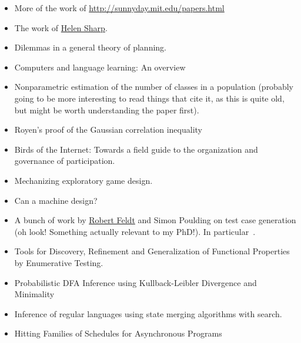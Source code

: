 \documentclass[a4paper]{book}
\begin{document}
\begin{itemize}
\item More of the work of \href{Nancy Leveson}{http://sunnyday.mit.edu/papers.html}
\item The work of \href{http://mcs.open.ac.uk/hcs2/}{Helen Sharp}.
\item Dilemmas in a general theory of planning\cite{rittel1973dilemmas}.
\item Computers and language learning: An overview\cite{warschauer1998computers}
\item Nonparametric estimation of the number of classes in a population\cite{chao1984nonparametric} (probably going to be more interesting to read things that cite it, as this is quite old, but might be worth understanding the paper first).
\item Royen’s proof of the Gaussian correlation inequality\cite{latala2017royen}
\item Birds of the Internet: Towards a field guide to the organization and governance of participation\cite{fish2011birds}.
\item Mechanizing exploratory game design\cite{smith2012mechanizing}.
\item Can a machine design?\cite{cross2001can}
\item A bunch of work by \href{http://www.robertfeldt.net/}{Robert Feldt} and Simon Poulding on test case generation
(oh look! Something actually relevant to my PhD!).
In particular~\cite{DBLP:conf/icst/PouldingF15, DBLP:conf/issre/FeldtP13, DBLP:conf/icse/FeldtP15}.
\item Tools for Discovery, Refinement and Generalization of Functional Properties by Enumerative Testing\cite{matela2017tools}.
\item Probabilistic DFA Inference using Kullback-Leibler Divergence and Minimality\cite{DBLP:conf/icml/ThollardDH00}
\item Inference of regular languages using state merging algorithms with search\cite{DBLP:journals/pr/BugalhoO05}.
\item Hitting Families of Schedules for Asynchronous Programs\cite{DBLP:conf/cav/ChistikovMN16}
\end{itemize}

{}

\end{document}
